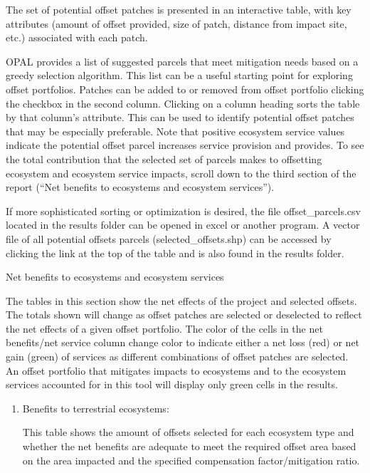 \documentclass[11pt,letterpaper]{report}
\newenvironment{myenumerate}{%
	\edef\backupindent{\the\parindent}
	\enumerate
	\setlength{\parindent}{\backupindent}
		\setlist[enumerate,1]{label=(\arabic*)}
		\setlist[enumerate,2]{label=(\arabic*)}
}{\endenumerate}
\begin{document}
\begin{myenumerate}
			The set of potential offset patches is presented in an interactive table, with key attributes (amount of offset provided, size of patch, distance from impact site, etc.) associated with each patch.
	
			OPAL provides a list of suggested parcels that meet mitigation needs based on a greedy selection algorithm. This list can be a useful starting point for exploring offset portfolios. Patches can be added to or removed from offset portfolio clicking the checkbox in the second column. Clicking on a column heading sorts the table by that column's attribute. This can be used to identify potential offset patches that may be especially preferable. Note that positive ecosystem service values indicate the potential offset parcel increases service provision and provides. To see the total contribution that the selected set of parcels makes to offsetting ecosystem and ecosystem service impacts, scroll down to the third section of the report (``Net benefits to ecosystems and ecosystem services'').
			
			If more sophisticated sorting or optimization is desired, the file offset\_{}parcels.csv located in the results folder can be opened in excel or another program. A vector file of all potential offsets parcels (selected\_{}offsets.shp) can be accessed by clicking the link at the top of the table and is also found in the results folder.
		
		{\bfseries \item  Net benefits to ecosystems and ecosystem services}
		
			The tables in this section show the net effects of the project and selected offsets. The totals shown will change as offset patches are selected or deselected to reflect the net effects of a given offset portfolio. The color of the cells in the net benefits/net service column change color to indicate either a net loss (red) or net gain (green) of services as different combinations of offset patches are selected. An offset portfolio that mitigates impacts to ecosystems and to the ecosystem services accounted for in this tool will display only green cells in the results. 
			
			\begin{enumerate}[label=\alph*]
				\item Benefits to terrestrial ecosystems:
				
					This table shows the amount of offsets selected for each ecosystem type and whether the net benefits are adequate to meet the required offset area based on the area impacted and the specified compensation factor/mitigation ratio.
					

\end{enumerate}
\end{myenumerate}
\end{document}
